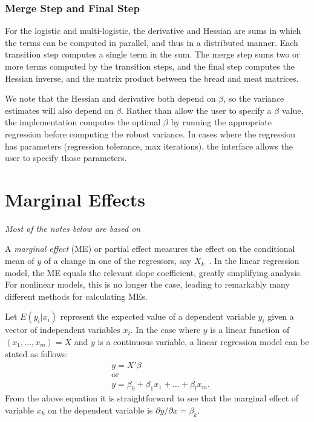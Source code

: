 \subsubsection{Merge Step and Final Step}

For the logistic and multi-logistic, the derivative and Hessian are sums in which the terms can be computed in parallel, and thus in a distributed manner.  Each transition step computes a single term in the sum.  The merge step sums two or more terms computed by the transition steps, and the final step computes the Hessian inverse, and the matrix product between the bread and meat matrices.  

We note that the Hessian and derivative both depend on $\beta$, so the variance estimates will also depend on $\beta$.  Rather than allow the user to specify a $\beta$ value, the implementation computes the optimal $\beta$ by running the appropriate regression  before computing the robust variance.  In cases where the regression has parameters (regression tolerance, max iterations), the interface allows the user to specify those parameters.


\pagebreak

\section{Marginal Effects} %
\label{sub:marginal_effects}
\textit{Most of the notes below are based on~\cite{diekmann2008}}

A \emph{marginal effect} (ME) or partial effect measures the effect on the
conditional mean of $y$ of a change in one of the regressors, say
$X_k$~\cite{cameron2009}. In the linear regression model, the ME equals the
relevant slope coefficient, greatly simplifying analysis. For nonlinear models,
this is no longer the case, leading to remarkably many different methods for
calculating MEs.

Let $E(y_i | x_i)$ represent the expected value of a dependent variable $y_i$
given a vector of independent variables $x_i$. In the case where $y$ is a
linear function of $(x_1, \dots, x_m) = X$ and $y$ is a continuous variable, a
linear regression model can be stated as follows:
\begin{align*}
    & y = X' \beta \\
    & \text{or} \\
    & y = \beta_0 + \beta_1 x_1 +  \dots  + \beta_l x_m.
\end{align*}
From the above equation it is straightforward to see that the marginal effect of
variable $x_k$ on the dependent variable is $\partial y / \partial x = \beta_k$.

